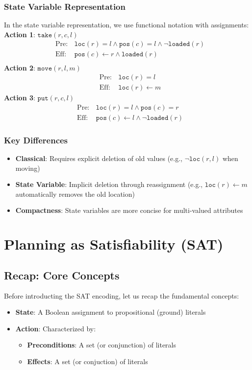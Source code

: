 \documentclass[a4paper]{article}
\theoremstyle{definition}
\begin{document}
\subsubsection{State Variable Representation}
In the state variable representation, we use functional notation with assignments:
\vspace{1em}
\noindent
\newline
\textbf{Action 1}: \( \texttt{take}(r,c,l) \)   
\begin{align*}
    &\mathrm{Pre}: & \texttt{loc}(r) = l \wedge \texttt{pos}(c) = l \wedge \lnot \texttt{loaded}(r) \\
    &\mathrm{Eff}: & \texttt{pos}(c) \leftarrow r \wedge \texttt{loaded}(r) \\
\end{align*}
\textbf{Action 2}: \( \texttt{move}(r,l,m) \)    
\begin{align*}
    &\mathrm{Pre}: & \texttt{loc}(r) = l \\
    &\mathrm{Eff}: & \texttt{loc}(r) \leftarrow m 
\end{align*}
\textbf{Action 3}: \( \texttt{put}(r,c,l) \)   
\begin{align*}
    &\mathrm{Pre}: & \texttt{loc}(r) = l \wedge \texttt{pos}(c) = r\\
    &\mathrm{Eff}: & \texttt{pos}(c) \leftarrow l \wedge \lnot \texttt{loaded}(r)
\end{align*}
\subsubsection{Key Differences}
\begin{itemize}
    \item \textbf{Classical}: Requires explicit deletion of old values (e.g., \( \lnot \texttt{loc}(r,l) \) when moving) 
    \item \textbf{State Variable}: Implicit deletion through reassignment (e.g., \( \texttt{loc}(r) \leftarrow m \) automatically removes the old location) 
    \item \textbf{Compactness}: State variables are more concise for multi-valued attributes
\end{itemize}
\section{Planning as Satisfiability (SAT)}
\subsection{Recap: Core Concepts}
Before introducting the SAT encoding, let us recap the fundamental concepts:
\begin{itemize}
    \item \textbf{State}: A Boolean assignment to propositional (ground) literals
    \item \textbf{Action}: Characterized by:
    \begin{itemize}
        \item \textbf{Preconditions}: A set (or conjunction) of literals 
        \item \textbf{Effects}: A set (or conjuction) of literals
    \end{itemize}
\end{itemize}
\end{document}
